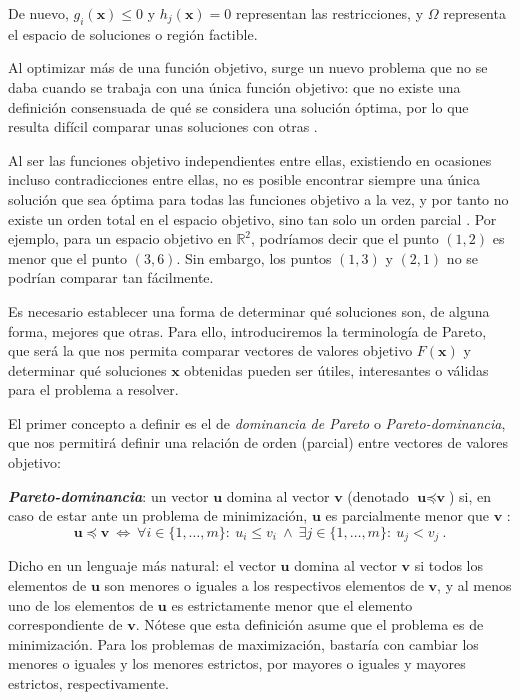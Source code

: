 De nuevo, $g_i(\textbf{x}) \leq 0$ y $h_j(\textbf{x}) = 0$ representan las restricciones, y $\Omega$ representa el espacio de soluciones o región factible.

Al optimizar más de una función objetivo, surge un nuevo problema que no se daba cuando se trabaja con una única función objetivo: que no existe una definición consensuada de qué se considera una solución óptima, por lo que resulta difícil comparar unas soluciones con otras \cite{mukhopadhyay2013survey}.


Al ser las funciones objetivo independientes entre ellas, existiendo en ocasiones incluso contradicciones entre ellas, no es posible encontrar siempre una única solución que sea óptima para todas las funciones objetivo a la vez, y por tanto no existe un orden total en el espacio objetivo, sino tan solo un orden parcial \cite{miettinen2012nonlinear}. Por ejemplo, para un espacio objetivo en $\mathbb{R}^2$, podríamos decir que el punto $(1,2)$ es menor que el punto $(3,6)$. Sin embargo, los puntos $(1,3)$ y $(2,1)$ no se podrían comparar tan fácilmente.

Es necesario establecer una forma de determinar qué soluciones son, de alguna forma, mejores que otras. Para ello, introduciremos la terminología de Pareto, que será la que nos permita comparar vectores de valores objetivo $F(\textbf{x})$ y determinar qué soluciones $\textbf{x}$ obtenidas pueden ser útiles, interesantes o válidas para el problema a resolver.

El primer concepto a definir es el de \emph{dominancia de Pareto} o \emph{Pareto-dominancia}, que nos permitirá definir una relación de orden (parcial) entre vectores de valores objetivo:

\begin{definicion}
	\textbf{\emph{Pareto-dominancia}}: un vector $\textbf{u}$ domina al vector $\textbf{v}$ (denotado $\textbf{u} \preceq \textbf{v}$) si, en caso de estar ante un problema de  minimización, $\textbf{u}$ es parcialmente menor que $\textbf{v}$ \cite{jose2016automatic}\cite{coello2007evolutionary}:
	\begin{equation}
	\textbf{u} \preceq \textbf{v} ~\Longleftrightarrow~ \forall i \in \{1,\dots,m\}:~ u_i \leq v_i ~\land~ \exists j \in \{1,\dots,m\}:~ u_j < v_j~.
	\end{equation}
\end{definicion}

Dicho en un lenguaje más natural: el vector $\textbf{u}$ domina al vector $\textbf{v}$ si todos los elementos de $\textbf{u}$ son menores o iguales a los respectivos elementos de $\textbf{v}$, y al menos uno de los elementos de $\textbf{u}$ es estrictamente menor que el elemento correspondiente de $\textbf{v}$. Nótese que esta definición asume que el problema es de minimización. Para los problemas de maximización, bastaría con cambiar los menores o iguales y los menores estrictos, por mayores o iguales y mayores estrictos, respectivamente.

